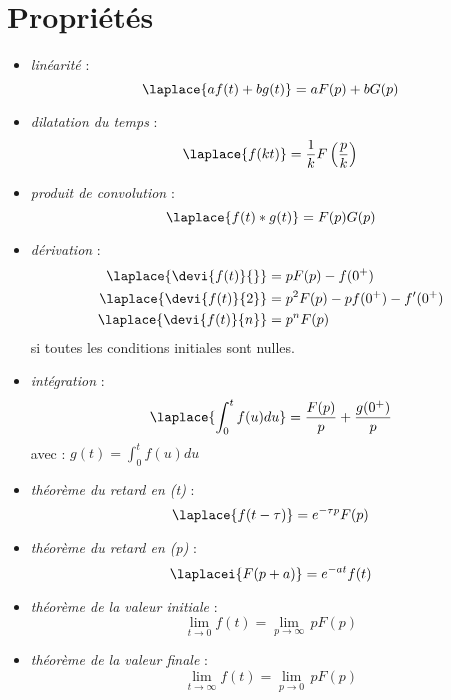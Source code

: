 \section{Propriétés} 
\begin{itemize}
    \item \emph{linéarité} :
    \[ 
        \laplace{af(t)+bg(t)} = aF(p) + bG(p)
    \]
    \item \emph{dilatation du temps} : 
    \[ 
        \laplace{f(kt)}=\dfrac{1}{k}F\left(\dfrac{p}{k}\right)
    \]
    \item \emph{produit de convolution} : 
    \[
        \laplace{f(t)*g(t)} = F(p)G(p)
    \]
    \item \emph{dérivation} : 
    \begin{align*}
        \laplace{\devi{f(t)}{}}&=pF(p) - f(0^+) \\
        \laplace{\devi{f(t)}{2}}&=p^2F(p) - pf(0^+) - f'(0^+)\\
        \laplace{\devi{f(t)}{n}}&=p^nF(p) 
    \end{align*}
    si toutes les conditions initiales sont nulles.
    \item \emph{intégration} :
    \[
        \laplace{\int_0^t f(u)du} = \dfrac{F(p)}{p} + \dfrac{g(0^+)}{p}
    \]
        avec :  $g(t)=\int_0^t f(u)du$
    \item \emph{théorème du retard en (t)} :
    \[
        \laplace{f(t-\tau)}=e^{-\tau p}F(p)
    \]
    \item \emph{théorème du retard en (p)} :
    \[
        \laplacei{F(p+a)}=e^{-at}f(t)
    \]
    \item \emph{théorème de la valeur initiale} :
    \[
        \lim\limits_{t \to 0} f(t)=\lim\limits_{p \to \infty}\, p F(p)
    \]
    \item \emph{théorème de la valeur finale} :
    \[
        \lim\limits_{t \to \infty} f(t)=\lim\limits_{p \to 0}\,p F(p)
    \]
\end{itemize}
\clearpage

